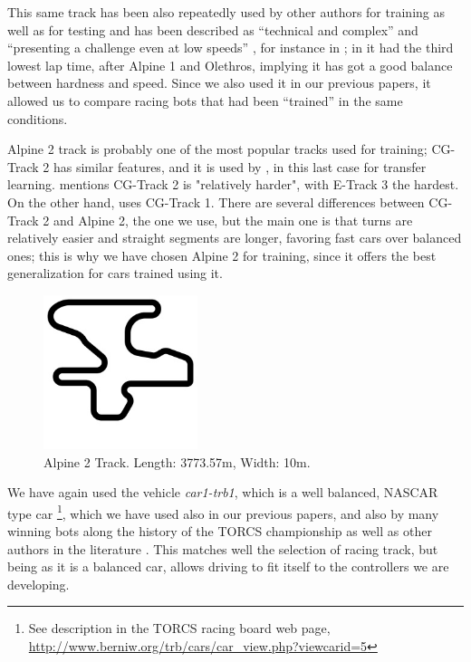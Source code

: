 \documentclass[10pt,journal,compsoc]{IEEEtran}
\begin{document}
This same track has been also repeatedly used by other authors for training as well as for testing and has been described as ``technical and complex'' \cite{AG} and ``presenting a challenge even at low speeds'' \cite{vrajitoru2018global}, for instance in
\cite{cardamone2010applying,CarRacing_Pelta09,zong2017obstacle}; in \cite{AG} it had the third lowest lap time, after Alpine 1 and Olethros, implying it
has got a good balance between hardness and speed. Since we also used
it in our previous papers, it allowed us to compare racing bots that
had been ``trained'' in the same conditions.

Alpine 2 track is probably one of the most popular tracks used for
training; CG-Track 2 has similar features, and it is used by
\cite{mirus2019short,8833873,verma2018programmatically},
in this last case for transfer learning. \cite{Kole-ParamCarTunning12}
mentions CG-Track 2 is "relatively harder", with E-Track 3 the
hardest. On the other hand, \cite{10.1371/journal.pone.0213193} uses
CG-Track 1. There are several differences between CG-Track 2 and Alpine
2, the one we use, but the main one is that turns are relatively
easier and straight segments are longer, favoring fast cars over
balanced ones; this is why we have chosen Alpine 2 for training, since
it offers the best generalization for cars trained using it.

\begin{figure}[!ht]	
	\begin{center}
		\includegraphics[width=4.5cm]{fig/alpine2.jpg}
		\caption{Alpine 2 Track. Length: 3773.57m, Width: 10m.}
		\label{fig:alpine2_track}	
	\end{center}	
\end{figure}

We have again used the vehicle \textit{car1-trb1},
which is a well balanced, NASCAR type car \footnote{See description in
  the TORCS racing board web page,
  \url{http://www.berniw.org/trb/cars/car_view.php?viewcarid=5}},
which we have used also in our previous papers, and also by many
winning bots along the history of the TORCS championship
\cite{torcs5} as well as other authors in the literature
\cite{auteur2010,li2019reinforcement}. This matches well the selection
of racing track, but being as it is a balanced car, allows driving to
fit itself to the controllers we are developing.
\end{document}
